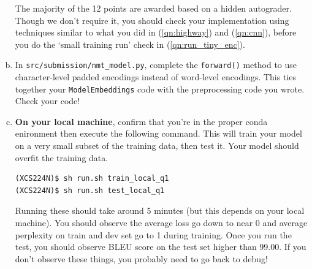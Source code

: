\begin{enumerate}[(a)]
    The majority of the 12 points are awarded based on a hidden autograder. Though we don't require it, you should check your implementation using techniques similar to what you did in (\ref{qn:highway}) and (\ref{qn:cnn}), before you do the `small training run' check in (\ref{qn:run_tiny_enc}). 

    \item {}
    In \texttt{src/submission/nmt\_model.py}, complete the \texttt{forward()} method to use character-level padded encodings instead of word-level encodings.
    This ties together your \texttt{ModelEmbeddings} code with the preprocessing code you wrote. Check your code!
    
    \item {} \label{qn:run_tiny_enc} \textbf{On your local machine}, confirm that you're in the proper conda enironment then execute the following command. 
    This will train your model on a very small subset of the training data, then test it. Your model should overfit the training data.
\begin{lstlisting}
(XCS224N)$ sh run.sh train_local_q1
(XCS224N)$ sh run.sh test_local_q1
\end{lstlisting}

    Running these should take around 5 minutes (but this depends on your local machine). 
    You should observe the average loss go down to near 0 and average perplexity on train and dev set go to 1 during training. Once you run the test, you should observe BLEU score on the test set higher than 99.00. 
    If you don't observe these things, you probably need to go back to debug!

\end{enumerate}
